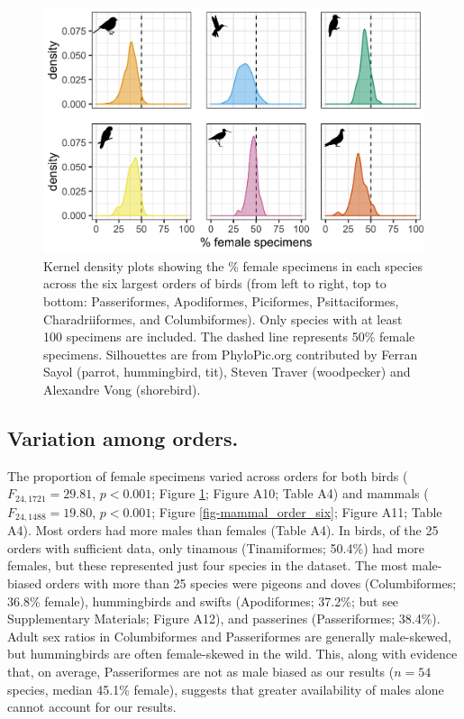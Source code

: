 \documentclass[a4paper, 12pt]{article}
\begin{document}
\begin{figure}
 \centering
  \includegraphics[width = \linewidth]{figures/orders-density-birds-six.png}
  \caption{Kernel density plots showing the \% female specimens in each species across the six largest orders of birds (from left to right, top to bottom: Passeriformes, Apodiformes, Piciformes, Psittaciformes, Charadriiformes, and Columbiformes). 
  Only species with at least 100 specimens are included. 
  The dashed line represents 50\% female specimens. 
  Silhouettes are from PhyloPic.org contributed by Ferran Sayol (parrot, hummingbird, tit), Steven Traver (woodpecker) and Alexandre Vong (shorebird).}
  \label{fig-bird_order_six}
\end{figure}

\subsection{Variation among orders.} 
The proportion of female specimens varied across orders for both birds ($F_{24, 1721} = 29.81$, $p < 0.001$; Figure \ref{fig-bird_order_six}; Figure A10; Table A4) and mammals ($F_{24, 1488} = 19.80$, $p < 0.001$; Figure \ref{fig-mammal_order_six}; Figure A11; Table A4). 
Most orders had more males than females (Table A4). 
In birds, of the 25 orders with sufficient data, only tinamous (Tinamiformes; 50.4\%) had more females, but these represented just four species in the dataset. 
The most male-biased orders with more than 25 species were pigeons and doves (Columbiformes; 36.8\% female), hummingbirds and swifts (Apodiformes; 37.2\%; but see Supplementary Materials; Figure A12), and passerines (Passeriformes; 38.4\%). 
Adult sex ratios in Columbiformes and Passeriformes are generally male-skewed\cite{szekely2014sex,bosque2019skewed,mayr1939sex}, but hummingbirds are often female-skewed in the wild\cite{szekely2014sex,mayr1939sex}. 
This, along with evidence that, on average, Passeriformes are not as male biased as our results ($n = 54$ species, median 45.1\% female\cite{szekely2014sex}), suggests that greater availability of males alone cannot account for our results.
\end{document}
